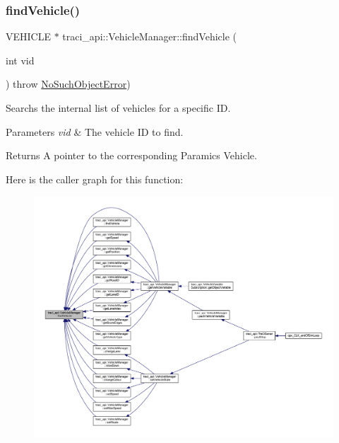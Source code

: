 \subsubsection{\texorpdfstring{find\+Vehicle()}{findVehicle()}\hspace{0.1cm}{\footnotesize\ttfamily [1/2]}}
{\footnotesize\ttfamily V\+E\+H\+I\+C\+LE $\ast$ traci\+\_\+api\+::\+Vehicle\+Manager\+::find\+Vehicle (\begin{DoxyParamCaption}\item[{int}]{vid }\end{DoxyParamCaption}) throw  \hyperlink{classtraci__api_1_1_no_such_object_error}{No\+Such\+Object\+Error}) }



Searchs the internal list of vehicles for a specific ID. 


\begin{DoxyParams}{Parameters}
{\em vid} & The vehicle ID to find. \\
\hline
\end{DoxyParams}
\begin{DoxyReturn}{Returns}
A pointer to the corresponding Paramics Vehicle. 
\end{DoxyReturn}
Here is the caller graph for this function\+:\nopagebreak
\begin{figure}[H]
\begin{center}
\leavevmode
\includegraphics[width=350pt]{classtraci__api_1_1_vehicle_manager_a46fe50f2be4e9eb6df8f62b9a6e7aa53_icgraph}
\end{center}
\end{figure}
\mbox{\label{classtraci__api_1_1_vehicle_manager_a4fc72da33abd7a0323fd27c7721ba3ef}} 

